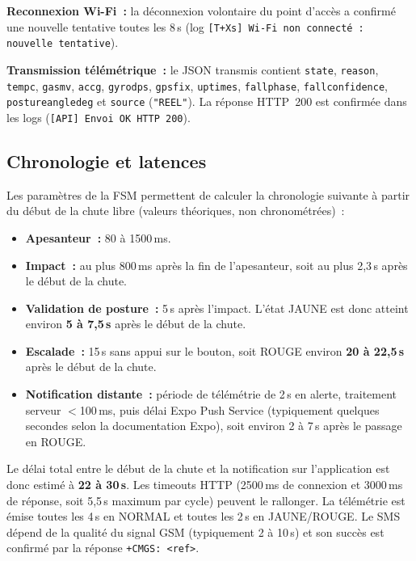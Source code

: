 \documentclass[12pt,a4paper]{article}
\renewcommand{\_}{\textunderscore\allowbreak}
\begin{document}
\textbf{Reconnexion Wi-Fi~:} la déconnexion volontaire du point d'accès a confirmé une nouvelle tentative toutes les 8\,s (log \texttt{[T+Xs] Wi-Fi non connecté : nouvelle tentative}).

\textbf{Transmission télémétrique~:} le JSON transmis contient \texttt{state}, \texttt{reason}, \texttt{temp\_c}, \texttt{gas\_mv}, \texttt{acc\_g}, \texttt{gyro\_dps}, \texttt{gps\_fix}, \texttt{uptime\_s}, \texttt{fall\_phase}, \texttt{fall\_confidence}, \texttt{posture\_angle\_deg} et \texttt{source} (\texttt{"REEL"}). La réponse HTTP~200 est confirmée dans les logs (\texttt{[API] Envoi OK HTTP 200}).



\subsection{Chronologie et latences}

Les paramètres de la FSM permettent de calculer la chronologie suivante à partir du début de la chute libre (valeurs théoriques, non chronométrées)~:
\begin{itemize}
    \item \textbf{Apesanteur~:} 80 à 1500\,ms.
    \item \textbf{Impact~:} au plus 800\,ms après la fin de l'apesanteur, soit au plus 2,3\,s après le début de la chute.
    \item \textbf{Validation de posture~:} 5\,s après l'impact. L'état JAUNE est donc atteint environ \textbf{5 à 7,5\,s} après le début de la chute.
    \item \textbf{Escalade~:} 15\,s sans appui sur le bouton, soit ROUGE environ \textbf{20 à 22,5\,s} après le début de la chute.
    \item \textbf{Notification distante~:} période de télémétrie de 2\,s en alerte, traitement serveur $<$100\,ms, puis délai Expo Push Service (typiquement quelques secondes selon la documentation Expo), soit environ 2 à 7\,s après le passage en ROUGE.
\end{itemize}
Le délai total entre le début de la chute et la notification sur l'application est donc estimé à \textbf{22 à 30\,s}. Les timeouts HTTP (2500\,ms de connexion et 3000\,ms de réponse, soit 5,5\,s maximum par cycle) peuvent le rallonger. La télémétrie est émise toutes les 4\,s en NORMAL et toutes les 2\,s en JAUNE/ROUGE. Le SMS dépend de la qualité du signal GSM (typiquement 2 à 10\,s) et son succès est confirmé par la réponse \texttt{+CMGS: <ref>}.
\end{document}

